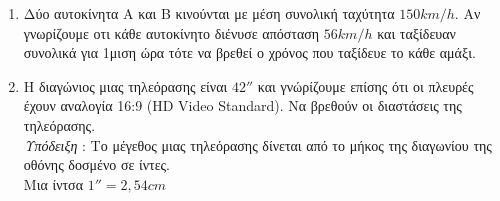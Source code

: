 \documentclass[twoside,nofonts,internet]{askhseis}
\begin{document}
\begin{enumerate}[label=\bf\textcolor{\xrwma}{{\large \arabic*.}},
itemsep=5mm]
\item Δύο αυτοκίνητα Α και Β κινούνται με μέση συνολική ταχύτητα $ 150km/h $. Αν γνωρίζουμε οτι κάθε αυτοκίνητο διένυσε απόσταση $ 56km/h $ και ταξίδευαν συνολικά για 1μιση ώρα τότε να βρεθεί ο χρόνος που ταξίδευε το κάθε αμάξι.
\item Η διαγώνιος μιας τηλεόρασης είναι $ 42'' $ και γνώρίζουμε επίσης ότι οι πλευρές έχουν αναλογία 16:9 (HD Video Standard). Να βρεθούν οι διαστάσεις της τηλεόρασης.\\
{\footnotesize \textit{Υπόδειξη} : Το μέγεθος μιας τηλεόρασης δίνεται από το μήκος της διαγωνίου της οθόνης δοσμένο σε ίντες.\\Μια ίντσα $ 1''=2{,}54cm $}
\end{enumerate}
\end{document}
